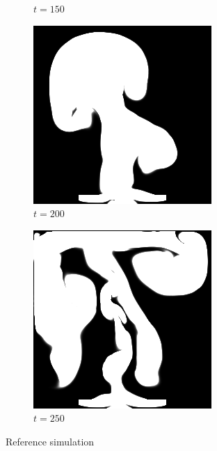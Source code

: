 \documentclass[a4paper,12pt,twoside]{report}
\begin{document}
\begin{figure}
\begin{subfigure}{0.18\textwidth}
  \caption{$t=150$}
\end{subfigure}
\begin{subfigure}{0.18\textwidth}
  \centering
  \includegraphics[scale=0.28]{buoyancy/dens_000200_ref.png}
  \caption{$t=200$}
\end{subfigure}
\begin{subfigure}{0.18\textwidth}
  \centering
  \includegraphics[scale=0.28]{buoyancy/dens_000249_ref.png}
  \caption{$t=250$}
\end{subfigure}
\caption{Reference simulation}
\end{figure}
\end{document}
